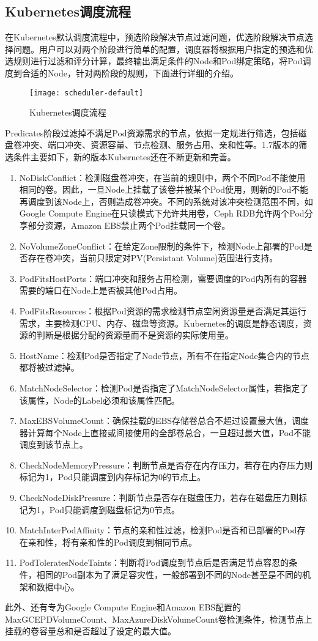 \subsection{Kubernetes调度流程}
在Kubernetes默认调度流程中，预选阶段解决节点过滤问题，优选阶段解决节点选择问题。用户可以对两个阶段进行简单的配置，调度器将根据用户指定的预选和优选规则进行过滤和评分计算，最终输出满足条件的Node和Pod绑定策略，将Pod调度到合适的Node，针对两阶段的规则，下面进行详细的介绍。
\begin{figure}[H] %
	\centering
	\texttt{[image: scheduler-default]}
	\caption{Kubernetes调度流程}
\end{figure}
Predicates阶段过滤掉不满足Pod资源需求的节点，依据一定规进行筛选，包括磁盘卷冲突、端口冲突、资源容量、节点检测、服务占用、亲和性等。1.7版本的筛选条件主要如下，新的版本Kubernetes还在不断更新和完善。
\begin{enumerate}[(1)]
	\item NoDiskConflict：检测磁盘卷冲突，在当前的规则中，两个不同Pod不能使用相同的卷。因此，一旦Node上挂载了该卷并被某个Pod使用，则新的Pod不能再调度到该Node上，否则造成卷冲突。不同的系统对该冲突检测范围不同，如Google Compute Engine在只读模式下允许共用卷，Ceph RDB允许两个Pod分享部分资源，Amazon EBS禁止两个Pod挂载同一个卷。
	\item NoVolumeZoneConflict：在给定Zone限制的条件下，检测Node上部署的Pod是否存在卷冲突，当前只限定对PV(Persistant Volume)范围进行支持。
	\item PodFitsHostPorts：端口冲突和服务占用检测，需要调度的Pod内所有的容器需要的端口在Node上是否被其他Pod占用。
	\item PodFitsResources：根据Pod资源的需求检测节点空闲资源量是否满足其运行需求，主要检测CPU、内存、磁盘等资源。Kubernetes的调度是静态调度，资源的判断是根据分配的资源量而不是资源的实际使用量。
	\item HostName：检测Pod是否指定了Node节点，所有不在指定Node集合内的节点都将被过滤掉。
	\item MatchNodeSelector：检测Pod是否指定了MatchNodeSelector属性，若指定了该属性，Node的Label必须和该属性匹配。
	\item MaxEBSVolumeCount：确保挂载的EBS存储卷总合不超过设置最大值，调度器计算每个Node上直接或间接使用的全部卷总合，一旦超过最大值，Pod不能调度到该节点上。
	\item CheckNodeMemoryPressure：判断节点是否存在内存压力，若存在内存压力则标记为1，Pod只能调度到内存标记为0的节点上。
	\item CheckNodeDiskPressure：判断节点是否存在磁盘压力，若存在磁盘压力则标记为1，Pod只能调度到磁盘标记为0节点。
	\item MatchInterPodAffinity：节点的亲和性过滤，检测Pod是否和已部署的Pod存在亲和性，将有亲和性的Pod调度到相同节点。
	\item PodToleratesNodeTaints：判断将Pod调度到节点后是否满足节点容忍的条件，相同的Pod副本为了满足容灾性，一般部署到不同的Node甚至是不同的机架和数据中心。
\end{enumerate}
此外、还有专为Google Compute Engine和Amazon EBS配置的MaxGCEPDVolumeCount、MaxAzureDiskVolumeCount卷检测条件，检测节点上挂载的卷容量总和是否超过了设定的最大值。

